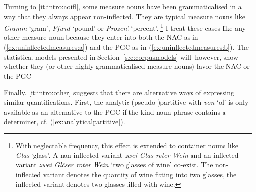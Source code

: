 \documentclass[USenglish]{article}
\begin{document}
Turning to \ref{it:intro:noifl}, some measure nouns have been grammaticalised in a way that they always appear non-inflected.
They are typical measure nouns like \textit{Gramm} `gram', \textit{Pfund} `pound' or \textit{Prozent} `percent'.%
\footnote{With neglectable frequency, this effect is extended to container nouns like \textit{Glas} `glass'.
A non-inflected variant \textit{zwei Glas roter Wein} and an inflected variant \textit{zwei Gläser roter Wein} `two glasses of wine' co-exist.
The non-inflected variant denotes the quantity of wine fitting into two glasses, the inflected variant denotes two glasses filled with wine.}
I treat these cases like any other measure noun because they enter into both the NAC as in (\ref{ex:uninflectedmeasures:a}) and the PGC as in (\ref{ex:uninflectedmeasures:b}).
The statistical models presented in Section~\ref{sec:corpusmodels} will, however, show whether they (or other highly grammaticalised measure nouns) favor the NAC or the PGC.

\begin{exe}
  \ex\label{ex:uninflectedmeasures}
  \begin{xlist}
  \end{xlist}
\end{exe}

Finally, \ref{it:intro:other} suggests that there are alternative ways of expressing similar quantifications.
First, the analytic (pseudo-)partitive with \textit{von} `of' is only available as an alternative to the PGC if the kind noun phrase contains a determiner, cf. (\ref{ex:analyticalpartitive}).

\begin{exe}
  \ex\label{ex:analyticalpartitive} 
  \begin{xlist}
  \end{xlist}
\end{exe}
\end{document}
